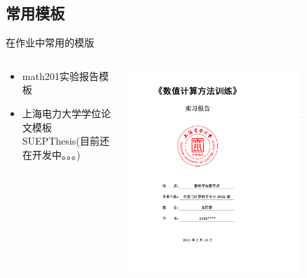 \subsection{常用模板}
\begin{frame}{在作业中常用的模版}
    \begin{columns}[c]
    \begin{column}{.45\textwidth}
        \begin{itemize}
            \item math201实验报告模板 
            \item 上海电力大学学位论文模板SUEPThesis(目前还在开发中。。。) 
        \end{itemize}
    \end{column}
    \begin{column}{.45\textwidth}
        \includegraphics[width=0.75\textwidth]{examples/math201.png}
      \end{column}
    \end{columns}
\end{frame}
